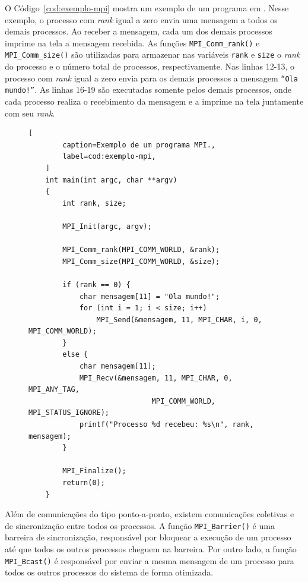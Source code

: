 O Código~\ref{cod:exemplo-mpi} mostra um exemplo de um programa em \mpi. Nesse
exemplo, o processo com \textit{rank} igual a zero
envia uma mensagem a todos os demais processos. Ao receber a mensagem, cada um dos demais processos imprime na tela a mensagem
recebida. As funções \texttt{MPI\_Comm\_rank()} e \texttt{MPI\_Comm\_size()} são utilizadas para armazenar nas variáveis \texttt{rank} e \texttt{size}
o \textit{rank} do processo e o número total de processos, respectivamente. Nas
linhas 12-13, o processo com \textit{rank} igual a zero envia para os
demais processos a mensagem \texttt{``Ola mundo!''}. As linhas 16-19 são executadas somente pelos demais processos, onde cada processo
realiza o recebimento da mensagem e a imprime na tela juntamente com seu \textit{rank}.

\begin{figure}[t]
	\begin{lstlisting}[
		caption=Exemplo de um programa MPI.,
		label=cod:exemplo-mpi,
	]
	int main(int argc, char **argv)
	{
		int rank, size;

		MPI_Init(argc, argv);

		MPI_Comm_rank(MPI_COMM_WORLD, &rank);
		MPI_Comm_size(MPI_COMM_WORLD, &size);

		if (rank == 0) {
			char mensagem[11] = "Ola mundo!";
			for (int i = 1; i < size; i++)
				MPI_Send(&mensagem, 11, MPI_CHAR, i, 0, MPI_COMM_WORLD);
		}
		else {
			char mensagem[11];
			MPI_Recv(&mensagem, 11, MPI_CHAR, 0, MPI_ANY_TAG,
                             MPI_COMM_WORLD, MPI_STATUS_IGNORE);
			printf("Processo %d recebeu: %s\n", rank, mensagem);
		}

		MPI_Finalize();
		return(0);
	}
	\end{lstlisting}
\end{figure}

Além de comunicações do tipo ponto-a-ponto, existem comunicações coletivas e de sincronização entre
todos os processos. A função \texttt{MPI\_Barrier()} é uma barreira de sincronização, responsável por bloquear a
execução de um processo até que todos os outros processos cheguem na barreira.
Por outro lado, a função \texttt{MPI\_Bcast()} é responsável por enviar a mesma
mensagem de um processo para todos os outros processos do sistema de forma otimizada.

